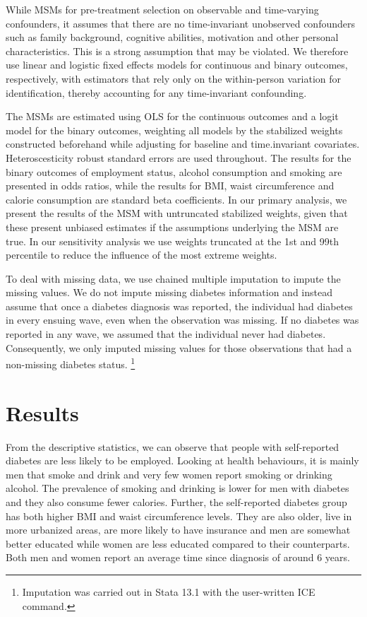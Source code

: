 While \acp{MSM} for pre-treatment selection on observable and time-varying confounders, it assumes that there are no time-invariant unobserved confounders such as family background, cognitive abilities, motivation and other personal characteristics. This is a strong assumption that may be violated. We therefore use linear and logistic fixed effects models for continuous and binary outcomes, respectively,  with estimators that rely only on the within-person variation for identification, thereby accounting for any time-invariant confounding.

The \acp{MSM} are estimated using \ac{OLS} for the continuous outcomes and a logit model for the binary outcomes, weighting all models by the stabilized weights constructed beforehand while adjusting for baseline and time.invariant covariates. Heteroscesticity robust standard errors are used throughout. The results for the binary outcomes of employment status, alcohol consumption and smoking are presented in odds ratios, while the results for \ac{BMI}, waist circumference and calorie consumption are standard beta coefficients. In our primary analysis, we present the results of the \ac{MSM} with untruncated stabilized weights, given that these present unbiased estimates if the assumptions underlying the \ac{MSM} are true. In our sensitivity analysis we use weights truncated at the 1st and 99th percentile to reduce the influence of the most extreme weights.

To deal with missing data, we use chained multiple imputation to impute the missing values. We do not impute missing diabetes information and instead assume that once a diabetes diagnosis was reported, the individual had diabetes in every ensuing wave, even when the observation was missing. If no diabetes was reported in any wave, we assumed that the individual never had diabetes. Consequently, we only imputed missing values for those observations that had a non-missing diabetes status. \footnote{Imputation was carried out in Stata 13.1 with the user-written ICE command.}

\section{Results}

From the descriptive statistics, we can observe that people with self-reported diabetes are less likely to be employed. Looking at health behaviours, it is mainly men that smoke and drink and very few women report smoking or drinking alcohol. The prevalence of smoking and drinking is lower for men with diabetes and they also consume fewer calories. Further, the self-reported diabetes group has both higher \ac{BMI} and waist circumference levels. They are also older, live in more urbanized areas, are more likely to have insurance and men are somewhat better educated while women are less educated compared to their counterparts. Both men and women report an average time since diagnosis of around 6 years.



